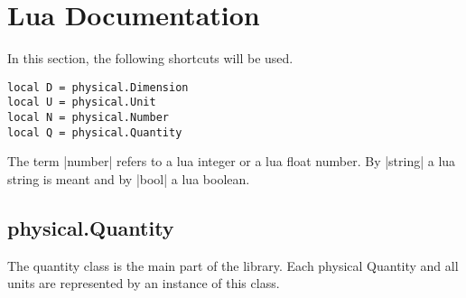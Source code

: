 \documentclass{ltxdoc}
\begin{document}
















\newpage
\section{Lua Documentation}

\newcommand{\method}[2]{\subsection*{|#1.#2|}\index[lua]{\texttt{#1.#2}}}

\newcommand{\subtitle}[1]{\noindent \\\textbf{#1}}

\lstset{language=Lua}

In this section, the following shortcuts will be used.
\begin{lstlisting}
local D = physical.Dimension
local U = physical.Unit
local N = physical.Number
local Q = physical.Quantity
\end{lstlisting}

The term |number| refers to a lua integer or a lua float number. By |string| a lua string is meant and by |bool| a lua boolean.



\subsection{physical.Quantity}
The quantity class is the main part of the library. Each physical Quantity and all units are represented by an instance of this class.
\end{document}
